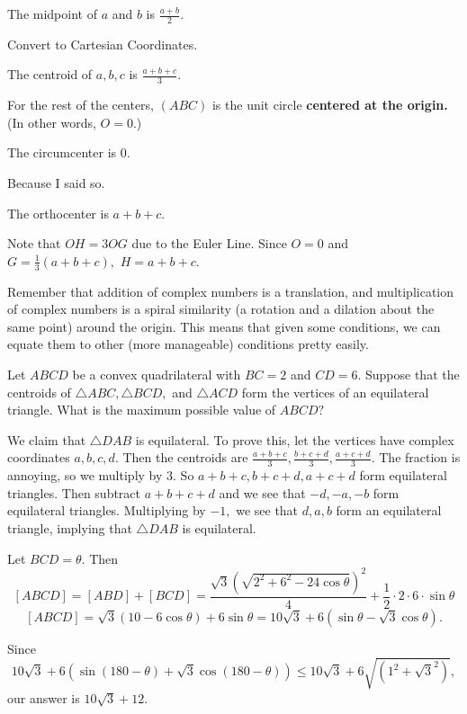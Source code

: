 \documentclass[blue,onecol]{shooting}
\begin{document}
\begin{theo}[Midpoint]
The midpoint of $a$ and $b$ is $\frac{a+b}{2}.$
\end{theo}

\begin{pro}
Convert to Cartesian Coordinates.
\end{pro}

\begin{theo}[Centroid]
The centroid of $a,b,c$ is $\frac{a+b+c}{3}.$
\end{theo}

For the rest of the centers, $(ABC)$ is the unit circle \textbf{centered at the origin.} (In other words, $O=0.$)

\begin{theo}[Circumcenter]
The circumcenter is $0.$
\end{theo}

\begin{pro}
Because I said so.
\end{pro}

\begin{theo}[Orthocenter]
The orthocenter is $a+b+c.$
\end{theo}

\begin{pro}
Note that $OH=3OG$ due to the Euler Line. Since $O=0$ and $G=\frac{1}{3}(a+b+c),$ $H=a+b+c.$
\end{pro}

Remember that addition of complex numbers is a translation, and multiplication of complex numbers is a spiral similarity (a rotation and a dilation about the same point) around the origin. This means that given some conditions, we can equate them to other (more manageable) conditions pretty easily.

\begin{exam}[AMC 12B 2019/25]
Let $ABCD$ be a convex quadrilateral with $BC=2$ and $CD=6.$ Suppose that the centroids of $\triangle ABC,\triangle BCD,$ and $\triangle ACD$ form the vertices of an equilateral triangle. What is the maximum possible value of $ABCD?$
\end{exam}

\begin{sol}
We claim that $\triangle DAB$ is equilateral. To prove this, let the vertices have complex coordinates $a,b,c,d.$ Then the centroids are $\frac{a+b+c}{3},\frac{b+c+d}{3},\frac{a+c+d}{3}.$ The fraction is annoying, so we multiply by $3.$ So $a+b+c,b+c+d,a+c+d$ form equilateral triangles. Then subtract $a+b+c+d$ and we see that $-d,-a,-b$ form equilateral triangles. Multiplying by $-1,$ we see that $d,a,b$ form an equilateral triangle, implying that $\triangle DAB$ is equilateral.

Let $BCD=\theta.$ Then
$$[ABCD]=[ABD]+[BCD]=\frac{\sqrt{3}(\sqrt{2^2+6^2-24\cos\theta})^2}{4}+\frac{1}{2}\cdot 2\cdot 6\cdot \sin \theta$$
$$[ABCD]=\sqrt{3}(10-6\cos\theta)+6\sin\theta=10\sqrt{3}+6(\sin\theta-\sqrt{3}\cos\theta).$$

Since
\[10\sqrt{3}+6(\sin(180-\theta)+\sqrt{3}\cos(180-\theta))\leq 10\sqrt{3}+6\sqrt{(1^2+\sqrt{3}^2)},\]
our answer is $10\sqrt{3}+12.$
\end{sol}
\end{document}

